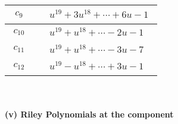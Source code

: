 \documentclass[1p]{elsarticle_modified}
\theoremstyle{definition}
\begin{document}
\begin{tabular}{m{50pt}|m{274pt}}
\hline $$\begin{aligned}c_{9}\end{aligned}$$&$\begin{aligned}
&u^{19}+3 u^{18}+\cdots+6 u-1
\end{aligned}$\\
\hline $$\begin{aligned}c_{10}\end{aligned}$$&$\begin{aligned}
&u^{19}+u^{18}+\cdots-2 u-1
\end{aligned}$\\
\hline $$\begin{aligned}c_{11}\end{aligned}$$&$\begin{aligned}
&u^{19}+u^{18}+\cdots-3 u-7
\end{aligned}$\\
\hline $$\begin{aligned}c_{12}\end{aligned}$$&$\begin{aligned}
&u^{19}- u^{18}+\cdots+3 u-1
\end{aligned}$\\
\hline
\end{tabular}\\~\\
\newpage\renewcommand{\arraystretch}{1}
\flushleft \textbf{(v) Riley Polynomials at the component}\newline \\
\end{document}
